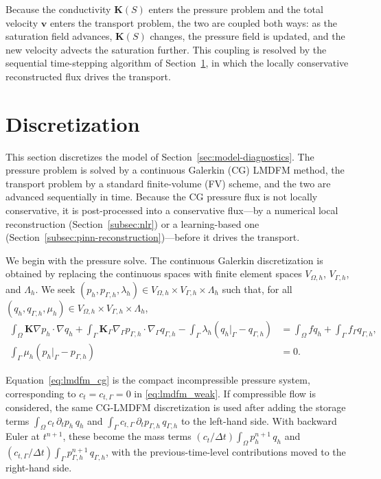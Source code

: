 \documentclass[a4paper,fleqn]{cas-sc}
\newcommand{\Kmat}{\mathbf{K}}
\newcommand{\vflux}{\mathbf{v}}
\begin{document}
Because the conductivity \(\Kmat(S)\) enters the pressure problem and the total
velocity \(\vflux\) enters the transport problem, the two are coupled both ways:
as the saturation field advances, \(\Kmat(S)\) changes, the pressure field is
updated, and the new velocity advects the saturation further. This coupling is
resolved by the sequential time-stepping algorithm of
Section~\ref{sec:flux-reconstruction}, in which the locally conservative
reconstructed flux drives the transport.

\section{Discretization}
\label{sec:flux-reconstruction}

This section discretizes the model of Section~\ref{sec:model-diagnostics}. The
pressure problem is solved by a continuous Galerkin (CG) LMDFM method, the
transport problem by a standard finite-volume (FV) scheme, and the two are
advanced sequentially in time. Because the CG pressure flux is not locally
conservative, it is post-processed into a conservative flux---by a numerical local
reconstruction (Section~\ref{subsec:nlr}) or a learning-based one
(Section~\ref{subsec:pinn-reconstruction})---before it drives the transport.

We begin with the pressure solve. The continuous Galerkin discretization is
obtained by replacing the continuous
spaces with finite element spaces \(V_{\Omega,h}\), \(V_{\Gamma,h}\), and
\(\Lambda_h\). We seek
\((p_h,p_{\Gamma,h},\lambda_h)\in V_{\Omega,h}\times V_{\Gamma,h}\times
\Lambda_h\) such that, for all
\((q_h,q_{\Gamma,h},\mu_h)\in V_{\Omega,h}\times V_{\Gamma,h}\times\Lambda_h\),
\begin{equation}
\begin{aligned}
\int_\Omega \Kmat\nabla p_h\cdot\nabla q_h
+\int_\Gamma \Kmat_\Gamma\nabla_\Gamma p_{\Gamma,h}\cdot\nabla_\Gamma q_{\Gamma,h}
-\int_\Gamma \lambda_h\left(q_h|_\Gamma-q_{\Gamma,h}\right)
&=
\int_\Omega f q_h
+\int_\Gamma f_\Gamma q_{\Gamma,h},\\
\int_\Gamma \mu_h\left(p_h|_\Gamma-p_{\Gamma,h}\right)&=0.
\end{aligned}
\label{eq:lmdfm_cg}
\end{equation}

Equation~\eqref{eq:lmdfm_cg} is the compact incompressible pressure system,
corresponding to \(c_t=c_{t,\Gamma}=0\) in \eqref{eq:lmdfm_weak}. If
compressible flow is considered, the same CG-LMDFM discretization is used after
adding the storage terms
\(\int_\Omega c_t\,\partial_t p_h\,q_h\) and
\(\int_\Gamma c_{t,\Gamma}\,\partial_t p_{\Gamma,h}\,q_{\Gamma,h}\) to the
left-hand side. With backward Euler at \(t^{n+1}\), these become the mass terms
\((c_t/\Delta t)\int_\Omega p_h^{n+1}\,q_h\) and
\((c_{t,\Gamma}/\Delta t)\int_\Gamma p_{\Gamma,h}^{n+1}\,q_{\Gamma,h}\), with the
previous-time-level contributions moved to the right-hand side.
\end{document}
